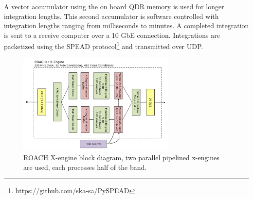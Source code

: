 \documentclass[useAMS,macros,usenatbib]{mn2e}
\begin{document}

A vector accumulator using the on board QDR memory is used for longer integration lengths.
This second accumulator is software controlled with integration lengths ranging from milliseconds to minutes.
A completed integration is sent to a receive computer over a 10 GbE connection.
Integrations are packetized using the SPEAD protocol\footnote{https://github.com/ska-sa/PySPEAD} and transmitted over UDP.


\begin{figure}
    \centering
    \includegraphics[width=0.7\textwidth]{graphics/crop_xengine_block.pdf}
    \caption{ROACH X-engine block diagram, two parallel pipelined x-engines are used, each processes half of the band.}
    \label{fig:xeng_block}
\end{figure}
\end{document}
